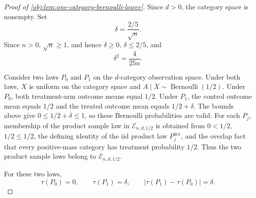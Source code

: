 \begin{proof}[Proof of \cref{obj:lem:one-category-bernoulli-lower}]
Since \(d>0\), the category space is nonempty. Set
\[
\delta=\frac{2/5}{\sqrt n}.
\]
Since \(n>0\), \(\sqrt n\ge1\), and hence \(\delta\ge0\), \(\delta\le2/5\), and
\[
\delta^2=\frac{4}{25n}.
\]

Consider two laws \(P_0\) and \(P_1\) on the \(d\)-category observation space. Under both laws, \(X\) is uniform on the category space and \(A\mid X\sim\operatorname{Bernoulli}(1/2)\). Under \(P_0\), both treatment-arm outcome means equal \(1/2\). Under \(P_1\), the control outcome mean equals \(1/2\) and the treated outcome mean equals \(1/2+\delta\). The bounds above give \(0\le 1/2+\delta\le1\), so these Bernoulli probabilities are valid. For each \(P_j\), membership of the product sample law in \(\mathcal E_{n,d,1/2}\) is obtained from \(0<1/2\), \(1/2\le1/2\), the defining identity of the iid product law \(P_j^{\otimes n}\), and the overlap fact that every positive-mass category has treatment probability \(1/2\). Thus the two product sample laws belong to \(\mathcal E_{n,d,1/2}\). %

For these two laws,
\[
\tau(P_0)=0,
\qquad
\tau(P_1)=\delta,
\qquad
|\tau(P_1)-\tau(P_0)|=\delta .
\]


\end{proof}
